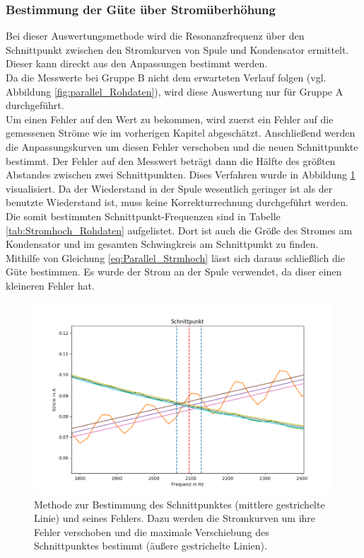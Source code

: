 \documentclass[12pt,a4paper]{article}
\begin{document}
\subsubsection{Bestimmung der Güte über Stromüberhöhung}
Bei dieser Auswertungsmethode wird die Resonanzfrequenz über den Schnittpunkt zwischen den Stromkurven von Spule und Kondensator ermittelt. Dieser kann direckt aus den Anpassungen bestimmt werden.\\
Da die Messwerte bei Gruppe B nicht dem erwarteten Verlauf folgen (vgl. Abbildung \ref{fig:parallel_Rohdaten}), wird diese Auswertung nur für Gruppe A durchgeführt.\\
Um einen Fehler auf den Wert zu bekommen, wird zuerst ein Fehler auf die gemessenen Ströme wie im vorherigen Kapitel abgeschätzt. Anschließend werden die Anpassungskurven um diesen Fehler verschoben und die neuen Schnittpunkte bestimmt. Der Fehler auf den Messwert beträgt dann die Hälfte des größten Abstandes zwischen zwei Schnittpunkten. Dises Verfahren wurde in Abbildung \ref{fig:parallel_Stromhoch} visualisiert.
Da der Wiederstand in der Spule wesentlich geringer ist als der benutzte Wiederstand ist, muss keine Korrekturrechnung durchgeführt werden.\\
Die somit bestimmten Schnittpunkt-Frequenzen sind in Tabelle \ref{tab:Stromhoch_Rohdaten} aufgelistet. Dort ist auch die Größe des Stromes am Kondensator und im gesamten Schwingkreis am Schnittpunkt zu finden. \\
Mithilfe von Gleichung \ref{eq:Parallel_Strmhoch} lässt sich daraus schließlich die Güte bestimmen. Es wurde der Strom an der Spule verwendet, da diser einen kleineren Fehler hat.

\begin{figure}
\centering
\includegraphics[scale=0.6]{Bilder/Parallel_Stromhoch.png}
\caption{Methode zur Bestimmung des Schnittpunktes (mittlere gestrichelte Linie) und seines Fehlers. Dazu werden die Stromkurven um ihre Fehler verschoben und die maximale Verschiebung des Schnittpunktes bestimmt (äußere gestrichelte Linien).}
\label{fig:parallel_Stromhoch}
\end{figure}
\end{document}
